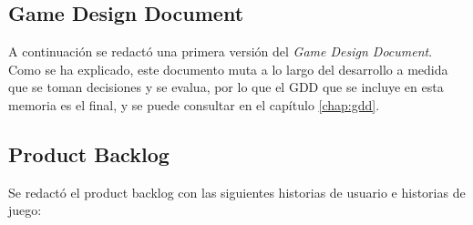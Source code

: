 \subsection{Game Design Document}

A continuación se redactó una primera versión del \textit{Game Design Document}. Como se ha explicado, este documento muta a lo largo del desarrollo a medida que se toman decisiones y se evalua, por lo que el GDD que se incluye en esta memoria es el final, y se puede consultar en el capítulo \ref{chap:gdd}.

\subsection{Product Backlog}

Se redactó el product backlog con las siguientes historias de usuario e historias de juego:


